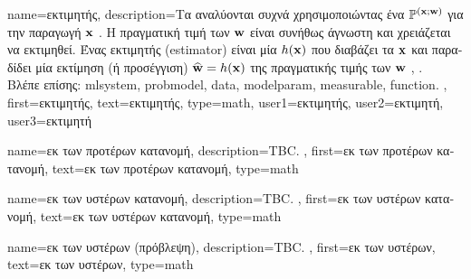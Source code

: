 {name={\foreignlanguage{greek}{εκτιμητής}},
	description={\foreignlanguage{greek}{Τα}  \foreignlanguage{greek}{αναλύονται 
		συχνά χρησιμοποιώντας ένα}  $\mathbb{P}^{({\bf x};{\bf w})}$ \foreignlanguage{greek}{για την παραγωγή}  
		 ${\bf x}$ \cite{MLBasics}. \foreignlanguage{greek}{Η πραγματική τιμή των}  ${\bf w}$ 
		\foreignlanguage{greek}{είναι συνήθως άγνωστη και χρειάζεται να εκτιμηθεί. Ένας εκτιμητής} (estimator) \foreignlanguage{greek}{είναι μία}  
		  $h({\bf x})$ \foreignlanguage{greek}{που διαβάζει τα}  
		${\bf x}$ \foreignlanguage{greek}{και παραδίδει μία εκτίμηση (ή προσέγγιση) $\widehat{{\bf w}} = h({\bf x})$ 
		της πραγματικής τιμής των}  ${\bf w}$ \cite{LC},  \cite{kay}.
		\\
		\foreignlanguage{greek}{Βλέπε επίσης:} \gls{mlsystem}, \gls{probmodel}, \gls{data}, \gls{modelparam}, \gls{measurable}, \gls{function}. },
	first={\foreignlanguage{greek}{εκτιμητής}},
	text={\foreignlanguage{greek}{εκτιμητής}},
	type=math,
	user1={\foreignlanguage{greek}{εκτιμητής}}, %
	user2={\foreignlanguage{greek}{εκτιμητή}}, %
	user3={\foreignlanguage{greek}{εκτιμητή}} %
}

{name={\foreignlanguage{greek}{εκ των προτέρων κατανομή}},
	description={TBC. },
	first={\foreignlanguage{greek}{εκ των προτέρων κατανομή}},
	text={\foreignlanguage{greek}{εκ των προτέρων κατανομή}},
	type=math
}

{name={\foreignlanguage{greek}{εκ των υστέρων κατανομή}},
	description={TBC. },
	first={\foreignlanguage{greek}{εκ των υστέρων κατανομή}},
	text={\foreignlanguage{greek}{εκ των υστέρων κατανομή}},
	type=math
}

{name={\foreignlanguage{greek}{εκ των υστέρων (πρόβλεψη)}}, 
	description={TBC. }, 
 	first={\foreignlanguage{greek}{εκ των υστέρων}}, 
 	text={\foreignlanguage{greek}{εκ των υστέρων}},
 	type=math
}


